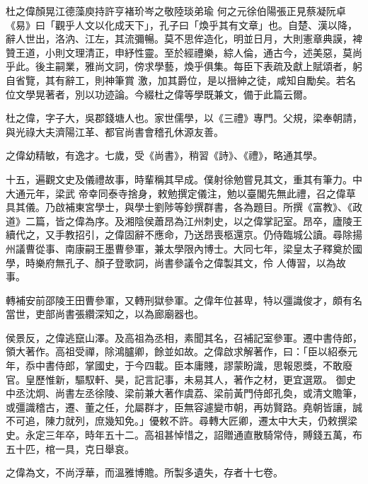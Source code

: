 
\begin{pinyinscope}

 杜之偉顏晃江德藻庾持許亨褚玠岑之敬陸琰弟瑜
 何之元徐伯陽張正見蔡凝阮卓《易》曰「觀乎人文以化成天下」，孔子曰「煥乎其有文章」也。自楚、漢以降，辭人世出，洛汭、江左，其流彌暢。莫不思侔造化，明並日月，大則憲章典謨，裨贊王道，小則文理清正，申紓性靈。至於經禮樂，綜人倫，通古今，述美惡，莫尚乎此。後主嗣業，雅尚文詞，傍求學藝，煥乎俱集。每臣下表疏及獻上賦頌者，躬自省覽，其有辭工，則神筆賞
 激，加其爵位，是以搢紳之徒，咸知自勵矣。若名位文學晃著者，別以功迹論。今綴杜之偉等學既兼文，備于此篇云爾。



 杜之偉，字子大，吳郡錢塘人也。家世儒學，以《三禮》專門。父規，梁奉朝請，與光祿大夫濟陽江革、都官尚書會稽孔休源友善。



 之偉幼精敏，有逸才。七歲，受《尚書》，稍習《詩》、《禮》，略通其學。



 十五，遍觀文史及儀禮故事，時輩稱其早成。僕射徐勉嘗見其文，重其有筆力。中大通元年，梁武
 帝幸同泰寺捨身，敕勉撰定儀注，勉以臺閣先無此禮，召之偉草具其儀。乃啟補東宮學士，與學士劉陟等鈔撰群書，各為題目。所撰《富教》、《政道》二篇，皆之偉為序。及湘陰侯蕭昂為江州刺史，以之偉掌記室。昂卒，廬陵王續代之，又手教招引，之偉固辭不應命，乃送昂喪柩還京。仍侍臨城公讀。尋除揚州議曹從事、南康嗣王墨曹參軍，兼太學限內博士。大同七年，梁皇太子釋奠於國學，時樂府無孔子、顏子登歌詞，尚書參議令之偉製其文，伶
 人傳習，以為故事。



 轉補安前邵陵王田曹參軍，又轉刑獄參軍。之偉年位甚卑，特以彊識俊才，頗有名當世，吏部尚書張纘深知之，以為廊廟器也。



 侯景反，之偉逃竄山澤。及高祖為丞相，素聞其名，召補記室參軍。遷中書侍郎，領大著作。高祖受禪，除鴻臚卿，餘並如故。之偉啟求解著作，曰：「臣以紹泰元年，忝中書侍郎，掌國史，于今四載。臣本庸賤，謬蒙盼識，思報恩獎，不敢廢官。皇歷惟新，驅馭軒、昊，記言記事，未易其人，著作之材，更宜選眾。
 御史中丞沈炯、尚書左丞徐陵、梁前兼大著作虞荔、梁前黃門侍郎孔奐，或清文贍筆，或彊識稽古，遷、董之任，允屬群才，臣無容遽變市朝，再妨賢路。堯朝皆讓，誠不可追，陳力就列，庶幾知免。」優敕不許。尋轉大匠卿，遷太中大夫，仍敕撰梁史。永定三年卒，時年五十二。高祖甚悼惜之，詔贈通直散騎常侍，賻錢五萬，布五十匹，棺一具，克日舉哀。



 之偉為文，不尚浮華，而溫雅博贍。所製多遺失，存者十七卷。




\end{pinyinscope}

